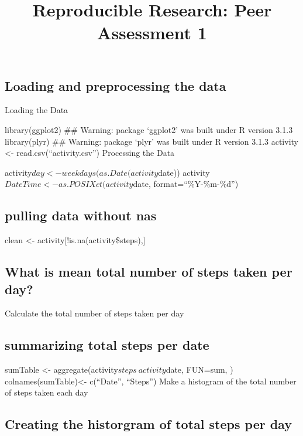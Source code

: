 \documentclass[]{article}
\title{Reproducible Research: Peer Assessment 1}
\author{}
\date{\vspace{-2.5em}}
\begin{document}
\maketitle

\subsection{Loading and preprocessing the
data}\label{loading-and-preprocessing-the-data}

Loading the Data

library(ggplot2) \#\# Warning: package `ggplot2' was built under R
version 3.1.3 library(plyr) \#\# Warning: package `plyr' was built under
R version 3.1.3 activity \textless{}- read.csv(``activity.csv'')
Processing the Data

activity\(day <- weekdays(as.Date(activity\)date))
activity\(DateTime<- as.POSIXct(activity\)date, format=``\%Y-\%m-\%d'')

\subsection{pulling data without nas}\label{pulling-data-without-nas}

clean \textless{}- activity{[}!is.na(activity\$steps),{]}

\subsection{What is mean total number of steps taken per
day?}\label{what-is-mean-total-number-of-steps-taken-per-day}

Calculate the total number of steps taken per day

\subsection{summarizing total steps per
date}\label{summarizing-total-steps-per-date}

sumTable \textless{}- aggregate(activity\(steps ~ activity\)date,
FUN=sum, ) colnames(sumTable)\textless{}- c(``Date'', ``Steps'') Make a
histogram of the total number of steps taken each day

\subsection{Creating the historgram of total steps per
day}\label{creating-the-historgram-of-total-steps-per-day}
\end{document}
